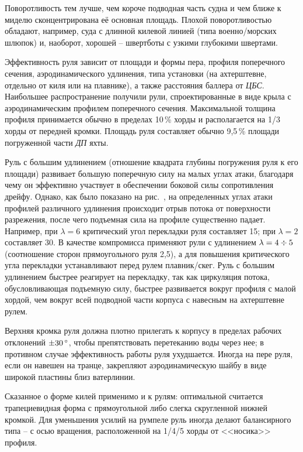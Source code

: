 Поворотливость тем лучше, чем короче подводная часть судна и чем ближе к миделю сконцентрирована её основная площадь. Плохой поворотливостью обладают, например, суда с длинной килевой линией (типа военно\-/морских шлюпок) и, наоборот, хорошей \--- швертботы с узкими глубокими швертами. 

Эффективность руля зависит от площади и формы пера, профиля поперечного сечения, аэродинамического удлинения, типа установки (на ахтерштевне, отдельно от киля или на плавнике), а также расстояния баллера от \textit{ЦБС}. Наибольшее распространение получили рули, спроектированные в виде крыла с аэродинамическим профилем поперечного сечения. Максимальной толщина профиля принимается обычно в пределах 10\,\% хорды и располагается на 1/3 хорды от передней кромки. Площадь руля составляет обычно 9,5\,\% площади погруженной части \textit{ДП} яхты. 

Руль с большим удлинением (отношение квадрата глубины погружения руля к его площади) развивает большую поперечную силу на малых углах атаки, благодаря чему он эффективно участвует в обеспечении боковой силы сопротивления дрейфу. Однако, как было показано на рис.~, на определенных углах атаки профилей различного удлинения происходит отрыв потока от поверхности разрежения, после чего подъемная сила на профиле существенно падает. Например, при $\lambda = 6$ критический угол перекладки руля составляет 15\gr; при $\lambda = 2$ составляет 30\gr. В качестве компромисса применяют рули с удлинением $\lambda = 4 \div 5$ (соотношение сторон прямоугольного руля 2,5), а для повышения критического угла перекладки устанавливают перед рулем плавник\-/скег. Руль с большим удлинением быстрее реагирует на перекладку, так как циркуляция потока, обусловливающая подъемную силу, быстрее развивается вокруг профиля с малой хордой, чем вокруг всей подводной части корпуса с навесным на ахтерштевне рулем. 

Верхняя кромка руля должна плотно прилегать к корпусу в пределах рабочих отклонений $\pm 30\,^\circ$, чтобы препятствовать перетеканию воды через нее; в противном случае эффективность работы руля ухудшается. Иногда на пере руля, если он навешен на транце, закрепляют аэродинамическую шайбу в виде широкой пластины близ ватерлинии.

Сказанное о форме килей применимо и к рулям: оптимальной считается трапециевидная форма с прямоугольной либо слегка скругленной нижней кромкой. Для уменьшения усилий на румпеле руль иногда делают балансирного типа \--- с осью вращения, расположенной на 1/4/5 хорды от <<носика>> профиля.


